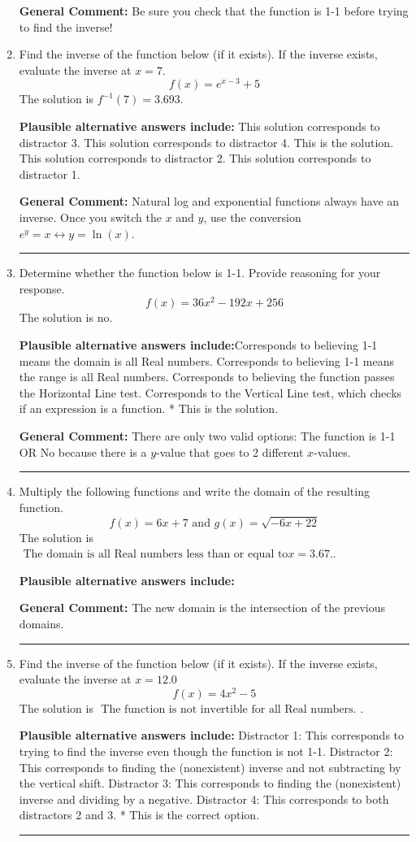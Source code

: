 \documentclass{extbook}[14pt]
\newcommand{\litem}[1]{\item #1

\rule{\textwidth}{0.4pt}}
\begin{document}
\begin{enumerate}
{\textbf{General Comment:} Be sure you check that the function is 1-1 before trying to find the inverse!
}
\litem{
Find the inverse of the function below (if it exists). If the inverse exists, evaluate the inverse at $x = 7$.
\[ f(x) = e^{x-3}+5 \]The solution is \( f^{-1}(7) = 3.693 \).\begin{enumerate}[label=\Alph*.]
\textbf{Plausible alternative answers include:} This solution corresponds to distractor 3.
 This solution corresponds to distractor 4.
 This is the solution.
 This solution corresponds to distractor 2.
 This solution corresponds to distractor 1.
\end{enumerate}

\textbf{General Comment:} Natural log and exponential functions always have an inverse. Once you switch the $x$ and $y$, use the conversion $ e^y = x \leftrightarrow y=\ln(x)$.
}
\litem{
Determine whether the function below is 1-1. Provide reasoning for your response.
\[ f(x) = 36 x^2 - 192 x + 256 \]The solution is \( \text{no} \).\begin{enumerate}[label=\Alph*.]
\textbf{Plausible alternative answers include:}Corresponds to believing 1-1 means the domain is all Real numbers.
Corresponds to believing 1-1 means the range is all Real numbers.
Corresponds to believing the function passes the Horizontal Line test.
Corresponds to the Vertical Line test, which checks if an expression is a function.
* This is the solution.
\end{enumerate}

\textbf{General Comment:} There are only two valid options: The function is 1-1 OR No because there is a $y$-value that goes to 2 different $x$-values.
}
\litem{
Multiply the following functions and write the domain of the resulting function.
\[ f(x) = 6x + 7 \text{ and } g(x) = \sqrt{-6x+22}  \]The solution is \( \text{ The domain is all Real numbers less than or equal to} x = 3.67. \).\begin{enumerate}[label=\Alph*.]
\textbf{Plausible alternative answers include:}




\end{enumerate}

\textbf{General Comment:} The new domain is the intersection of the previous domains.
}
\litem{
Find the inverse of the function below (if it exists). If the inverse exists, evaluate the inverse at $x = 12.0$
\[ f(x) = 4 x^2 - 5 \]The solution is \( \text{ The function is not invertible for all Real numbers. } \).\begin{enumerate}[label=\Alph*.]
\textbf{Plausible alternative answers include:} Distractor 1: This corresponds to trying to find the inverse even though the function is not 1-1. 
 Distractor 2: This corresponds to finding the (nonexistent) inverse and not subtracting by the vertical shift.
 Distractor 3: This corresponds to finding the (nonexistent) inverse and dividing by a negative.
 Distractor 4: This corresponds to both distractors 2 and 3.
* This is the correct option.
\end{enumerate}

}
\end{enumerate}
\end{document}
